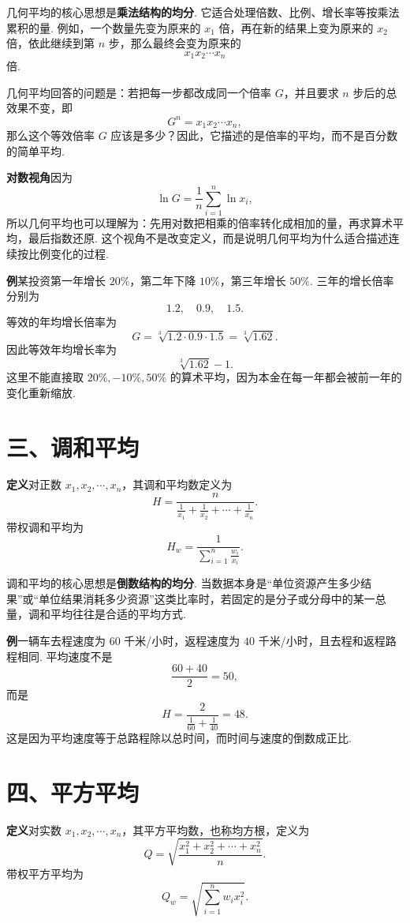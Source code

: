 \documentclass[UTF8,12pt,a4paper,fontset=fandol]{ctexart}
\begin{document}
几何平均的核心思想是\textbf{乘法结构的均分}. 它适合处理倍数、比例、增长率等按乘法累积的量. 例如，一个数量先变为原来的 $x_1$ 倍，再在新的结果上变为原来的 $x_2$ 倍，依此继续到第 $n$ 步，那么最终会变为原来的
\[
  x_1x_2\cdots x_n
\]
倍.

几何平均回答的问题是：若把每一步都改成同一个倍率 $G$，并且要求 $n$ 步后的总效果不变，即
\[
  G^n=x_1x_2\cdots x_n,
\]
那么这个等效倍率 $G$ 应该是多少？因此，它描述的是倍率的平均，而不是百分数的简单平均.

\noindent\textbf{对数视角}\quad 因为
\[
  \ln G=\frac{1}{n}\sum_{i=1}^n \ln x_i,
\]
所以几何平均也可以理解为：先用对数把相乘的倍率转化成相加的量，再求算术平均，最后指数还原. 这个视角不是改变定义，而是说明几何平均为什么适合描述连续按比例变化的过程.

\noindent\textbf{例}\quad 某投资第一年增长 $20\%$，第二年下降 $10\%$，第三年增长 $50\%$. 三年的增长倍率分别为
\[
  1.2,\quad 0.9,\quad 1.5.
\]
等效的年均增长倍率为
\[
  G=\sqrt[3]{1.2\cdot0.9\cdot1.5}=\sqrt[3]{1.62}.
\]
因此等效年均增长率为
\[
  \sqrt[3]{1.62}-1.
\]
这里不能直接取 $20\%,-10\%,50\%$ 的算术平均，因为本金在每一年都会被前一年的变化重新缩放.

\section*{三、调和平均}

\noindent\textbf{定义}\quad 对正数 $x_1,x_2,\cdots,x_n$，其调和平均数定义为
\[
  H=\frac{n}{\frac{1}{x_1}+\frac{1}{x_2}+\cdots+\frac{1}{x_n}}.
\]
带权调和平均为
\[
  H_w=\frac{1}{\sum_{i=1}^n \frac{w_i}{x_i}}.
\]

调和平均的核心思想是\textbf{倒数结构的均分}. 当数据本身是``单位资源产生多少结果''或``单位结果消耗多少资源''这类比率时，若固定的是分子或分母中的某一总量，调和平均往往是合适的平均方式.

\noindent\textbf{例}\quad 一辆车去程速度为 $60$ 千米/小时，返程速度为 $40$ 千米/小时，且去程和返程路程相同. 平均速度不是
\[
  \frac{60+40}{2}=50,
\]
而是
\[
  H=\frac{2}{\frac{1}{60}+\frac{1}{40}}=48.
\]
这是因为平均速度等于总路程除以总时间，而时间与速度的倒数成正比.

\section*{四、平方平均}

\noindent\textbf{定义}\quad 对实数 $x_1,x_2,\cdots,x_n$，其平方平均数，也称均方根，定义为
\[
  Q=\sqrt{\frac{x_1^2+x_2^2+\cdots+x_n^2}{n}}.
\]
带权平方平均为
\[
  Q_w=\sqrt{\sum_{i=1}^n w_i x_i^2}.
\]
\end{document}
